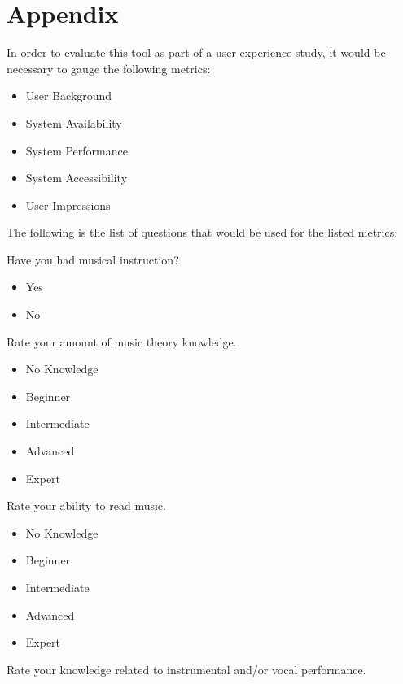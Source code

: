 \chapter*{Appendix}
\label{ch:appendix}

\noindent In order to evaluate this tool as part of a user experience study, it would be necessary to gauge the following metrics:

\begin{itemize}
	\item User Background
	\item System Availability
	\item System Performance
	\item System Accessibility
	\item User Impressions
\end{itemize}

\noindent The following is the list of questions that would be used for the listed metrics:

\vspace{\baselineskip}

\noindent Have you had musical instruction?

\begin{itemize}
	\item Yes
	\item No
\end{itemize}

\noindent Rate your amount of music theory knowledge.

\begin{itemize}
	\item No Knowledge
	\item Beginner
	\item Intermediate
	\item Advanced
	\item Expert
\end{itemize}

\noindent Rate your ability to read music.

\begin{itemize}
	\item No Knowledge
	\item Beginner
	\item Intermediate
	\item Advanced
	\item Expert
\end{itemize}

\noindent Rate your knowledge related to instrumental and/or vocal performance.

